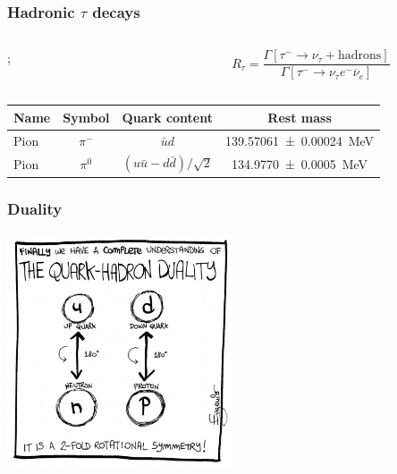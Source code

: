 \documentclass[fleqn]{beamer}
\begin{document}
\begin{frame}
  \frametitle{Hadronic \(\tau\) decays}
  \begin{columns}
    \begin{column}{0.4\textwidth}
      ;
    \end{column}

    \pause
    \begin{column}{0.6\textwidth}
      \begin{equation}
        R_\tau = \frac{\Gamma[\tau^- \to \nu_\tau + \text{hadrons}]}{\Gamma[\tau^- \to \nu_\tau e^- \overline{\nu}_{e}]}
      \end{equation}
    \end{column}
  \end{columns}

  \vspace{cm}
  
  \pause
  \centering
  \begin{tabular}{lccc}
    \toprule
    Name & Symbol & Quark content & Rest mass \\
    \midrule
    Pion & \(\pi^-\) & \(\bar u d\) & \SI{139.57061 \pm 0.00024}{\mega\eV}  \\
    Pion & \(\pi^0\) & \((u \bar u - d \bar d)/\sqrt{2}\) & \SI{134.9770\pm0.0005}{\mega\eV}
  \end{tabular}
   
\end{frame}
\begin{frame}
  \frametitle{Duality}
  \centering
  \includegraphics[width=0.5\textwidth]{./images/quarkHadronDuality.eps}
\end{frame}
\end{document}
